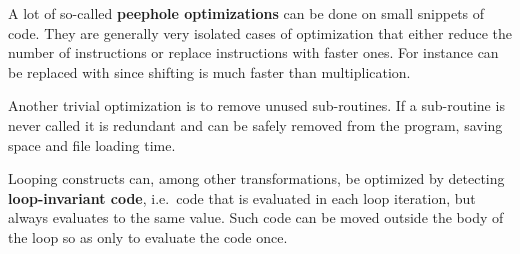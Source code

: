 A lot of so-called \textbf{peephole optimizations} can be done on small snippets
of code. They are generally very isolated cases of optimization that either
reduce the number of instructions or replace instructions with faster ones. For
instance  can be replaced with  since shifting is
much faster than multiplication.

Another trivial optimization is to remove unused sub-routines. If a sub-routine
is never called it is redundant and can be safely removed from the program,
saving space and file loading time.

Looping constructs can, among other transformations, be optimized by detecting
\textbf{loop-invariant code}, i.e.~code that is evaluated in each loop
iteration, but always evaluates to the same value. Such code can be moved
outside the body of the loop so as only to evaluate the code once.

